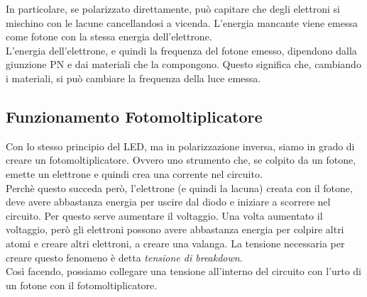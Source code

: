 In particolare, se polarizzato direttamente, può capitare che degli elettroni si mischino con le lacune cancellandosi a vicenda. L'energia mancante viene emessa come fotone con la stessa energia dell'elettrone.\\
L'energia dell'elettrone, e quindi la frequenza del fotone emesso, dipendono dalla giunzione PN e dai materiali che la compongono. Questo significa che, cambiando i materiali, si può cambiare la frequenza della luce emessa.\\

\subsection{Funzionamento Fotomoltiplicatore}
Con lo stesso principio del LED, ma in polarizzazione inversa, siamo in grado di creare un fotomoltiplicatore. Ovvero uno strumento che, se colpito da un fotone, emette un elettrone e quindi crea una corrente nel circuito.\\

Perchè questo succeda però, l'elettrone (e quindi la lacuna) creata con il fotone, deve avere abbastanza energia per uscire dal diodo e iniziare a scorrere nel circuito. Per questo serve aumentare il voltaggio. Una volta aumentato il voltaggio, però gli elettroni possono avere abbastanza energia per colpire altri atomi e creare altri elettroni, a creare una valanga. La tensione necessaria per creare questo fenomeno è detta \textit{tensione di breakdown}.\\

Così facendo, possiamo collegare una tensione all'interno del circuito con l'urto di un fotone con il fotomoltiplicatore.\\